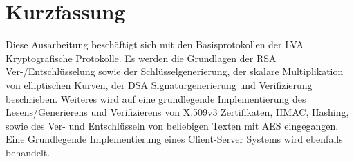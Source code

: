 
\thispagestyle{scrplain}

\section*{Kurzfassung}

Diese Ausarbeitung beschäftigt sich mit den Basisprotokollen der LVA Kryptografische Protokolle. Es werden die Grundlagen der RSA Ver-/Entschlüsselung sowie der Schlüsselgenerierung, der skalare Multiplikation von elliptischen Kurven, der DSA Signaturgenerierung und Verifizierung beschrieben.
Weiteres wird auf eine grundlegende Implementierung des Lesens/Generierens und Verifizierens von X.509v3 Zertifikaten, HMAC, Hashing, sowie des Ver- und Entschlüsseln von beliebigen Texten mit AES eingegangen.
Eine Grundlegende Implementierung eines Client-Server Systems wird ebenfalls behandelt.
